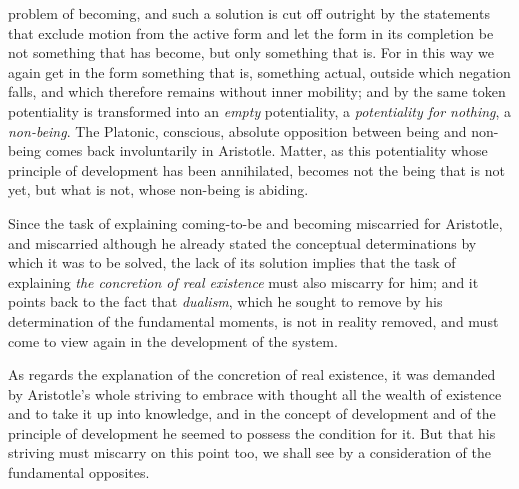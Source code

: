 problem of becoming, and such a solution is cut off outright by the
statements that exclude motion from the active form and let the form in
its completion be not something that has become, but only something that
is. For in this way we again get in the form something that is, something
actual, outside which negation falls, and which therefore remains without
inner mobility; and by the same token potentiality is transformed into an
\emph{empty} potentiality, a \emph{potentiality for nothing}, a
\emph{non-being}. The Platonic, conscious, absolute opposition between
being and non-being comes back involuntarily in Aristotle. Matter, as
this potentiality whose principle of development has been annihilated,
becomes not the being that is not yet, but what is not, whose non-being
is abiding.

Since the task of explaining coming-to-be and becoming miscarried for
Aristotle, and miscarried although he already stated the conceptual
determinations by which it was to be solved, the lack of its solution
implies that the task of explaining \emph{the concretion of real
existence} must also miscarry for him; and it points back to the fact
that \emph{dualism}, which he sought to remove by his determination of
the fundamental moments, is not in reality removed, and must come to
view again in the development of the system.

As regards the explanation of the concretion of real existence, it was
demanded by Aristotle's whole striving to embrace with thought all the
wealth of existence and to take it up into knowledge, and in the concept
of development and of the principle of development he seemed to possess
the condition for it. But that his striving must miscarry on this point
too, we shall see by a consideration of the fundamental opposites.

